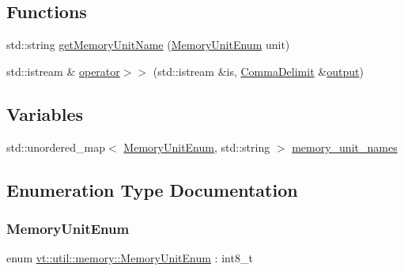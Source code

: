 \subsection*{Functions}
\begin{DoxyCompactItemize}
\item 
std\+::string \hyperlink{namespacevt_1_1util_1_1memory_a6a1de4e8806e74e6e0ef92e4262b654b}{get\+Memory\+Unit\+Name} (\hyperlink{namespacevt_1_1util_1_1memory_a64df3d84293b34009f78e2a1db2f9bb6}{Memory\+Unit\+Enum} unit)
\item 
std\+::istream \& \hyperlink{namespacevt_1_1util_1_1memory_afe1acbbca9aa1bd7310548cefd40045c}{operator$>$$>$} (std\+::istream \&is, \hyperlink{structvt_1_1util_1_1memory_1_1_comma_delimit}{Comma\+Delimit} \&\hyperlink{namespacevt_ad3ca3e8710dd3c8badff897f8de3c858}{output})
\end{DoxyCompactItemize}
\subsection*{Variables}
\begin{DoxyCompactItemize}
\item 
std\+::unordered\+\_\+map$<$ \hyperlink{namespacevt_1_1util_1_1memory_a64df3d84293b34009f78e2a1db2f9bb6}{Memory\+Unit\+Enum}, std\+::string $>$ \hyperlink{namespacevt_1_1util_1_1memory_aa772e07fd4860ed4086654c53eed51c2}{memory\+\_\+unit\+\_\+names}
\end{DoxyCompactItemize}


\subsection{Enumeration Type Documentation}
\mbox{\label{namespacevt_1_1util_1_1memory_a64df3d84293b34009f78e2a1db2f9bb6}} 
\subsubsection{\texorpdfstring{Memory\+Unit\+Enum}{MemoryUnitEnum}}
{\footnotesize\ttfamily enum \hyperlink{namespacevt_1_1util_1_1memory_a64df3d84293b34009f78e2a1db2f9bb6}{vt\+::util\+::memory\+::\+Memory\+Unit\+Enum} \+: int8\+\_\+t\hspace{0.3cm}{\ttfamily [strong]}}

